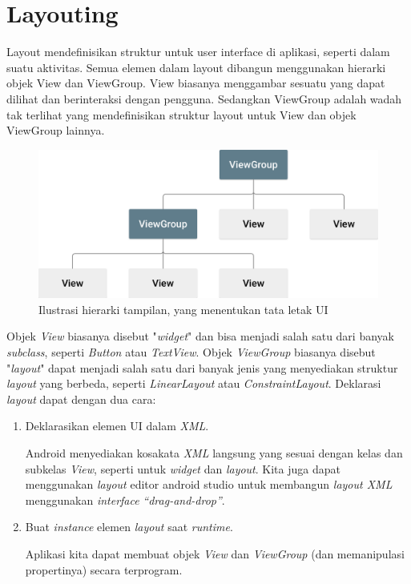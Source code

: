\section{Layouting}

Layout mendefinisikan struktur untuk user interface di aplikasi, seperti dalam suatu aktivitas. Semua elemen dalam layout dibangun menggunakan hierarki objek View dan ViewGroup. View biasanya menggambar sesuatu yang dapat dilihat dan berinteraksi dengan pengguna. Sedangkan ViewGroup adalah wadah tak terlihat yang mendefinisikan struktur layout untuk View dan objek ViewGroup lainnya.
\begin{figure}[H]
	\centering
	\includegraphics[keepaspectratio, width=12cm]{gambar/layout_hirarki}
	\caption{Ilustrasi hierarki tampilan, yang menentukan tata letak UI \citep{developerandroid}}
	\label{gambar:gambar_42}
\end{figure}

Objek \textit{View} biasanya disebut "\textit{widget}" dan bisa menjadi salah satu dari banyak \textit{subclass}, seperti \textit{Button} atau \textit{TextView}. Objek \textit{ViewGroup} biasanya disebut "\textit{layout}" dapat menjadi salah satu dari banyak jenis yang menyediakan struktur \textit{layout} yang berbeda, seperti \textit{LinearLayout} atau \textit{ConstraintLayout}. Deklarasi \textit{layout} dapat dengan dua cara:
\begin{enumerate}
\item Deklarasikan elemen UI dalam \textit{XML}. 

Android menyediakan kosakata \textit{XML} langsung yang sesuai dengan kelas dan subkelas \textit{View}, seperti untuk \textit{widget} dan \textit{layout}. Kita juga dapat menggunakan \textit{layout} editor android studio untuk membangun \textit{layout XML} menggunakan \textit{interface} \textit{“drag-and-drop”}.
\item Buat \textit{instance} elemen \textit{layout} saat \textit{runtime}. 

Aplikasi kita dapat membuat objek \textit{View} dan \textit{ViewGroup} (dan memanipulasi propertinya) secara terprogram.
\end{enumerate}

